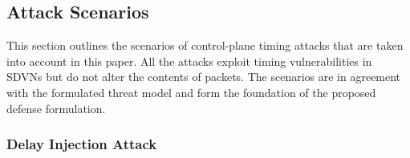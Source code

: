 \subsection{Attack Scenarios}

This section outlines the scenarios of control-plane timing attacks that are taken into account in this paper. All the attacks exploit timing vulnerabilities in SDVNs but do not alter the contents of packets. The scenarios are in agreement with the formulated threat model and form the foundation of the proposed defense formulation.

\subsubsection{Delay Injection Attack}

%
%
%
%
%

